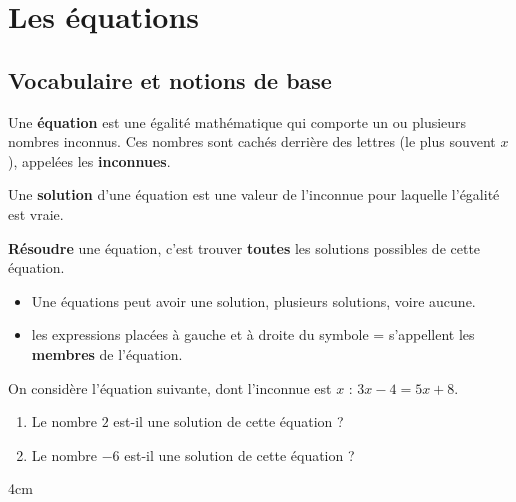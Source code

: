\documentclass[a4paper]{book}
\begin{document}
\setcounter{chapter}{13} %
\renewcommand{\monTitre}{Les équations}
\chapter{\monTitre}
\thispagestyle{fancy}

\section{Vocabulaire et notions de base}
    \begin{definition}
        Une \textbf{équation} est une égalité mathématique qui comporte un ou plusieurs nombres inconnus. Ces nombres sont cachés derrière des lettres (le plus souvent $x$), appelées les \textbf{inconnues}.
    \end{definition}

    
    \begin{definition}
        Une \textbf{solution} d'une équation est une valeur de l'inconnue pour laquelle l'égalité est vraie.
        
        \textbf{Résoudre} une équation, c'est trouver \textbf{toutes} les solutions possibles de cette équation.
    \end{definition}


    \begin{remarque}
        \begin{itemize}
            \item Une équations peut avoir une solution, plusieurs solutions, voire aucune.
            \item les expressions placées à gauche et à droite du symbole \og = \fg s'appellent les \textbf{membres} de l’équation.
        \end{itemize}    
    \end{remarque}

    
    \begin{exemple}
        On considère l'équation suivante, dont l'inconnue est $x$ : \quad $3x - 4 = 5x+8$.
        \begin{enumerate}
            \item Le nombre $2$ est-il une solution de cette équation ?
            \item Le nombre $-6$ est-il une solution de cette équation ?
        \end{enumerate}
        \begin{ZoneReponse}{4cm}
        \end{ZoneReponse}
    \end{exemple}
    
\end{document}

